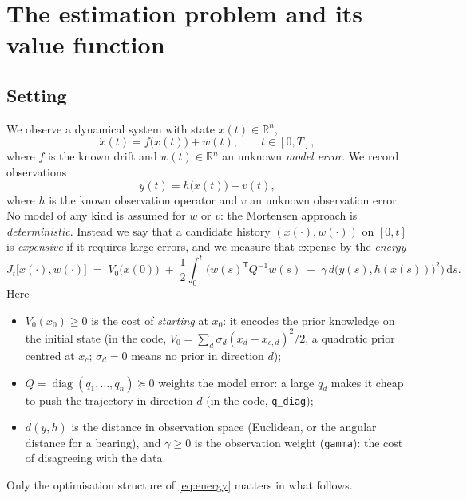 \documentclass[11pt,a4paper]{article}
\newcommand{\R}{\mathbb{R}}
\newcommand{\dd}{\,\mathrm{d}}
\newcommand{\T}{^{\mathsf T}}
\theoremstyle{plain}
\theoremstyle{definition}
\theoremstyle{remark}
\begin{document}
\tableofcontents

\section{The estimation problem and its value function}
\label{sec:setting}

\subsection{Setting}

We observe a dynamical system with state $x(t)\in\R^n$,
\begin{equation}
  \dot x(t) = f\big(x(t)\big) + w(t), \qquad t\in[0,T],
  \label{eq:dyn}
\end{equation}
where $f$ is the known drift and $w(t)\in\R^n$ an unknown \emph{model error}. We record observations
\begin{equation}
  y(t) = h\big(x(t)\big) + v(t),
  \label{eq:obs}
\end{equation}
where $h$ is the known observation operator and $v$ an unknown observation error. No model of any kind is assumed for $w$ or $v$: the Mortensen approach is \emph{deterministic}. Instead we say that a candidate history $(x(\cdot), w(\cdot))$ on $[0,t]$ is \emph{expensive} if it requires large errors, and we measure that expense by the \emph{energy}
\begin{equation}
  J_t\big[x(\cdot), w(\cdot)\big]
  \;=\; V_0\big(x(0)\big)
  \;+\; \frac12\int_0^t \Big( w(s)\T Q^{-1} w(s) \;+\; \gamma\, d\big(y(s), h(x(s))\big)^2 \Big)\dd s .
  \label{eq:energy}
\end{equation}
Here
\begin{itemize}[nosep]
  \item $V_0(x_0)\ge 0$ is the cost of \emph{starting} at $x_0$: it encodes the prior knowledge on the initial state (in the code, $V_0=\sum_d \sigma_d (x_d-x_{c,d})^2/2$, a quadratic prior centred at $x_c$; $\sigma_d=0$ means no prior in direction $d$);
  \item $Q=\operatorname{diag}(q_1,\dots,q_n)\succeq 0$ weights the model error: a large $q_d$ makes it cheap to push the trajectory in direction $d$ (in the code, \texttt{q\_diag});
  \item $d(y,h)$ is the distance in observation space (Euclidean, or the angular distance for a bearing), and $\gamma\ge0$ is the observation weight (\texttt{gamma}): the cost of disagreeing with the data.
\end{itemize}
Only the optimisation structure of \eqref{eq:energy} matters in what follows.
\end{document}
